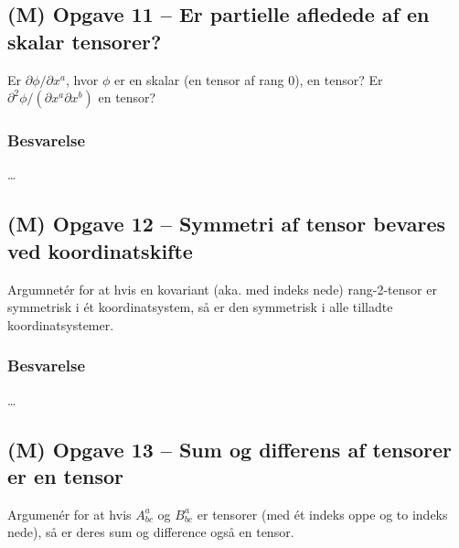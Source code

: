 \documentclass[../main.tex]{subfiles}
\begin{document}

\subsection{(M) Opgave 11 -- Er partielle afledede af en skalar tensorer?}
\setcounter{subsection}{11}
\setcounter{equation}{0}

Er $\partial \phi / \partial x^a$, hvor $\phi$ er en skalar (en tensor af rang $0$), en tensor? Er $\partial^2 \phi / (\partial x^a \partial x^b)$ en tensor?


\subsubsection{Besvarelse}

\ldots




\subsection{(M) Opgave 12 -- Symmetri af tensor bevares ved koordinatskifte}
\setcounter{subsection}{12}
\setcounter{equation}{0}

Argumnetér for at hvis en kovariant (aka. med indeks nede) rang-2-tensor er symmetrisk i ét koordinatsystem, så er den symmetrisk i alle tilladte koordinatsystemer.


\subsubsection{Besvarelse}

\ldots




\subsection{(M) Opgave 13 -- Sum og differens af tensorer er en tensor}
\setcounter{subsection}{13}
\setcounter{equation}{0}

Argumenér for at hvis $A^a_{bc}$ og $B^a_{bc}$ er tensorer (med ét indeks oppe og to indeks nede), så er deres sum og difference også en tensor.
\end{document}
